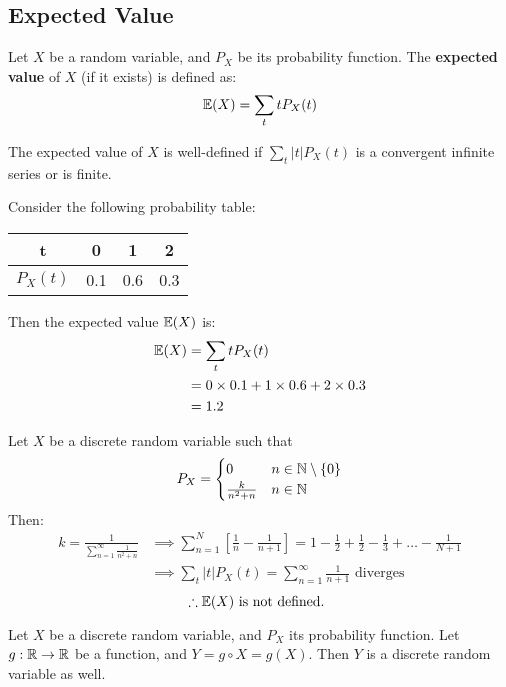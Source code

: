 \documentclass{article}
\begin{document}
\subsection{Expected Value}
	\begin{defn}
		Let $X$ be a random variable, and $P_X$ be its probability function. The \textbf{expected value} of $X$ (if it exists) is defined as:
		$$ \mathbb{E}(X)=\sum_t tP_X (t)$$
	\end{defn}
	\begin{rem}
		The expected value of $X$ is well-defined if $ \sum_t |t| P_X(t)$ is a convergent infinite series or is finite.
	\end{rem}
	\begin{exmp}
		Consider the following probability table:
		\begin{table}[h]
			\begin{tabular}{c|c|c|c}
				t & 0        & 1 & 2        \\ \hline
				$P_X(t)$ & 0.1 & 0.6 & 0.3
			\end{tabular}
		\end{table}
		Then the expected value $\mathbb{E}(X)$ is:
		\begin{align*}
			\mathbb{E}(X) &= \sum_t tP_X(t) \\
			&= 0 \times 0.1 + 1\times 0.6 + 2 \times 0.3 \\
			&= 1.2
		\end{align*}
	\end{exmp}
	\begin{exmp}
		Let $X$ be a discrete random variable such that 
		$$ P_X =
			\begin{cases}
				0 & n \in \mathbb{N} \setminus \{0\} \\
				\frac{k}{n^2 + n} & n \in \mathbb{N}
			\end{cases}
		$$
		Then:
		\begin{align*}
			k= \frac{1}{\sum_{n=1}^{\infty} \frac{1}{n^2 + n}} &\implies \sum_{n=1}^N \left[\frac{1}{n} -\frac{1}{n+1} \right] = 1 - \frac12 + \frac12 - \frac13 + \dots - \frac{1}{N+1} \\
			&\implies \sum_t |t| P_X(t) = \sum_{n=1}^\infty \frac{1}{n+1} \text{ diverges}
 		\end{align*}
 		$$ \therefore \mathbb{E}(X) \text{ is not defined. }$$
	\end{exmp}
	\begin{prop} \label{prop:3.2}
		Let $X$ be a discrete random variable, and $P_X$ its probability function. Let $g: \mathbb{R} \to \mathbb{R}$ be a function, and $Y= g \circ X = g(X)$. Then $Y$ is a discrete random variable as well.
		\begin{figure}[h]
		\end{figure}
	\end{prop}
\end{document}
